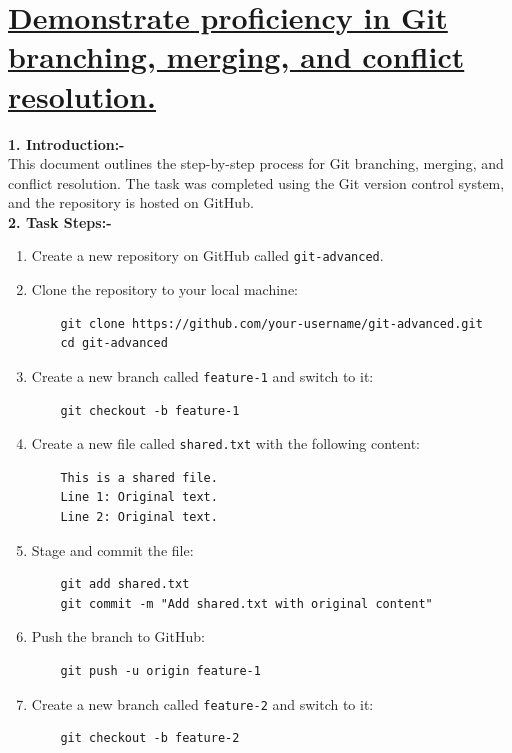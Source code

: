 \documentclass[a4paper,12pt]{article}
\begin{document}
\section*{\uline{Demonstrate proficiency in Git branching, merging, and conflict resolution.}}


\textbf{1. Introduction:-}\\
This document outlines the step-by-step process for Git branching, merging, and conflict resolution. The task was completed using the Git version control system, and the repository is hosted on GitHub.
\\
\textbf{2. Task Steps:-}\\

\begin{enumerate}
    \item Create a new repository on GitHub called \texttt{git-advanced}.
    \item Clone the repository to your local machine:
    \begin{verbatim}
    git clone https://github.com/your-username/git-advanced.git
    cd git-advanced
    \end{verbatim}
    
    \item Create a new branch called \texttt{feature-1} and switch to it:
    \begin{verbatim}
    git checkout -b feature-1
    \end{verbatim}
    
    \item Create a new file called \texttt{shared.txt} with the following content:
    \begin{verbatim}
    This is a shared file.
    Line 1: Original text.
    Line 2: Original text.
    \end{verbatim}
    
    \item Stage and commit the file:
    \begin{verbatim}
    git add shared.txt
    git commit -m "Add shared.txt with original content"
    \end{verbatim}
    
    \item Push the branch to GitHub:
    \begin{verbatim}
    git push -u origin feature-1
    \end{verbatim}
    
    \item Create a new branch called \texttt{feature-2} and switch to it:
    \begin{verbatim}
    git checkout -b feature-2
    \end{verbatim}
    

\end{enumerate}
\end{document}
